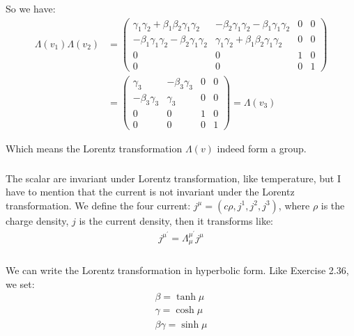 \documentclass[]{ctexart}
\begin{document}
			So we have: 
				\begin{equation*}
				\begin{aligned}
					\Lambda(v_1)\Lambda(v_2)&=
					\begin{pmatrix}
					\gamma_1\gamma_2+\beta_1\beta_2\gamma_1\gamma_2 & -\beta_2 \gamma_1\gamma_2- \beta_1 \gamma_1\gamma_2& 0 & 0\\
					-\beta_1 \gamma_1\gamma_2-\beta_2 \gamma_1\gamma_2 & \gamma_1\gamma_2+\beta_1\beta_2\gamma_1\gamma_2 & 0 & 0\\
					0 & 0 & 1 & 0\\
					0 & 0 & 0 & 1
					\end{pmatrix}\\
					&=
					\begin{pmatrix}
					\gamma_3 & -\beta_3 \gamma_3 & 0 & 0\\
					-\beta_3 \gamma_3 & \gamma_3 & 0 & 0\\
					0 & 0 & 1 & 0\\
					0 & 0 & 0 & 1
					\end{pmatrix}
					=
					\Lambda(v_3)
				\end{aligned}
				\end{equation*}
			
			Which means the Lorentz transformation $\Lambda(v)$ indeed form a group. 
			
		\subsubsection{}
			The scalar are invariant under Lorentz transformation, like temperature, but I have to mention that the current is not invariant under the Lorentz transformation. We define the four current: $j^{\mu}=(c\rho, j^1,j^2,j^3)$, where $\rho$ is the charge density, $j$ is the current density, then it transforms like:
				\begin{equation*}
				\begin{aligned}
					j^{\mu^{\prime}}=\Lambda^{\mu^{\prime}}_{\mu} j^{\mu}
				\end{aligned}
				\end{equation*}
			
		\subsubsection{}
			We can write the Lorentz transformation in hyperbolic form. Like Exercise 2.36, we set:
				\begin{equation*}
				\begin{aligned}
					\beta=\tanh \mu\\
					\gamma=\cosh \mu \\
					\beta \gamma=\sinh \mu
				\end{aligned}
				\end{equation*}
			
\end{document}
